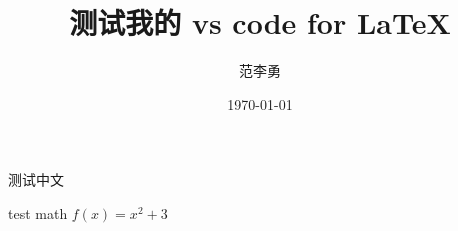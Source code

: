 \documentclass{article}%
\title{\heiti 测试我的 vs code for \LaTeX}%
\author{\kaishu 范李勇}%
\date{\today}%
\begin{document}
\maketitle
测试中文

test math $f(x)=x^2+3$ %
\end{document}
